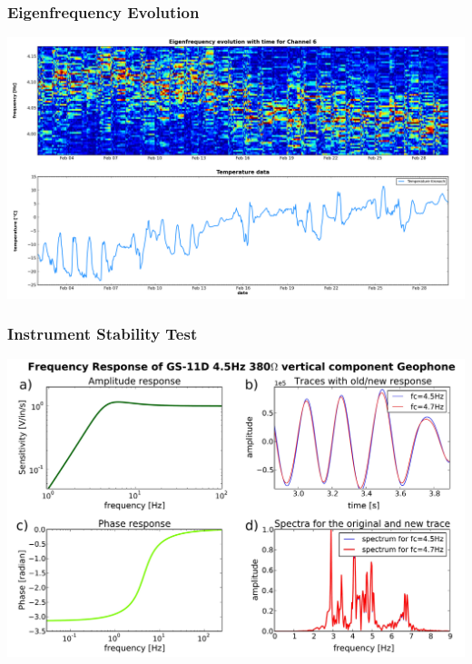 \documentclass[compress=false,usepdftitle=false, subsection=false,xcolor=dvipsnames]{beamer}
\begin{document}
\begin{frame}
	\frametitle{Eigenfrequency Evolution}
	\begin{center}
		\includegraphics[width=\linewidth]{Figures/eigenfreq_evolution.png}
    \end{center}
\end{frame}

\begin{frame}
	\frametitle{Instrument Stability Test}
	\begin{center}
		\includegraphics[width=.85\linewidth]{Figures/freq_resp2.JPEG}
    \end{center}
\end{frame}
%
\end{document}
